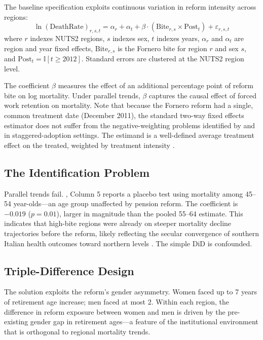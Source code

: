 \documentclass[12pt]{article}
\newcommand{\ind}{\mathbb{I}}
\begin{document}
The baseline specification exploits continuous variation in reform intensity across regions:
\begin{equation}
\ln(\text{DeathRate})_{r,s,t} = \alpha_r + \alpha_t + \beta \cdot (\text{Bite}_{r,s} \times \text{Post}_t) + \varepsilon_{r,s,t}
\label{eq:did}
\end{equation}
where $r$ indexes NUTS2 regions, $s$ indexes sex, $t$ indexes years, $\alpha_r$ and $\alpha_t$ are region and year fixed effects, $\text{Bite}_{r,s}$ is the Fornero bite for region $r$ and sex $s$, and $\text{Post}_t = \ind[t \geq 2012]$. Standard errors are clustered at the NUTS2 region level.

The coefficient $\beta$ measures the effect of an additional percentage point of reform bite on log mortality. Under parallel trends, $\beta$ captures the causal effect of forced work retention on mortality. Note that because the Fornero reform had a single, common treatment date (December 2011), the standard two-way fixed effects estimator does not suffer from the negative-weighting problems identified by \citet{goodman2021} and \citet{dechaisemartin2020} in staggered-adoption settings. The estimand is a well-defined average treatment effect on the treated, weighted by treatment intensity \citep{roth2023, callaway2021}.

\subsection{The Identification Problem}

Parallel trends fail. , Column 5 reports a placebo test using mortality among 45--54 year-olds---an age group unaffected by pension reform. The coefficient is $-0.019$ ($p = 0.01$), larger in magnitude than the pooled 55--64 estimate. This indicates that high-bite regions were already on steeper mortality decline trajectories before the reform, likely reflecting the secular convergence of southern Italian health outcomes toward northern levels \citep{drydakis2015}. The simple DiD is confounded.

\subsection{Triple-Difference Design}

The solution exploits the reform's gender asymmetry. Women faced up to 7 years of retirement age increase; men faced at most 2. Within each region, the difference in reform exposure between women and men is driven by the pre-existing gender gap in retirement ages---a feature of the institutional environment that is orthogonal to regional mortality trends.
\end{document}
